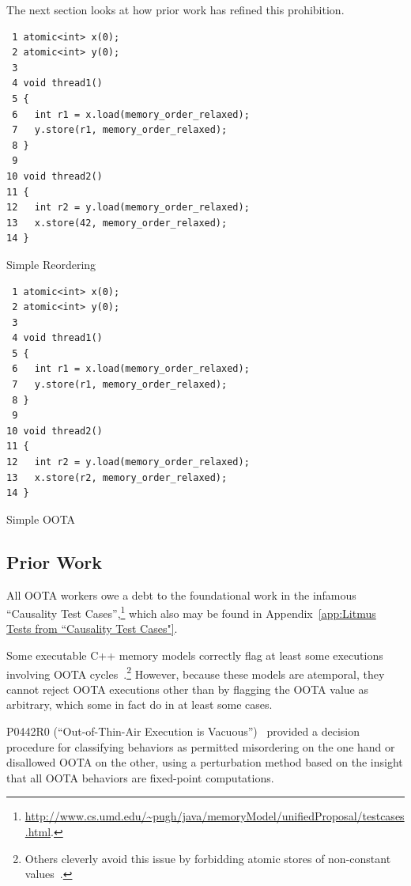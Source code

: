 \documentclass[10]{article}
\begin{document}
The next section looks at how prior work has refined this prohibition.

\begin{listing}[tbp]
\begin{verbatim}
 1 atomic<int> x(0);
 2 atomic<int> y(0);
 3
 4 void thread1()
 5 {
 6   int r1 = x.load(memory_order_relaxed);
 7   y.store(r1, memory_order_relaxed);
 8 }
 9
10 void thread2()
11 {
12   int r2 = y.load(memory_order_relaxed);
13   x.store(42, memory_order_relaxed);
14 }
\end{verbatim}
\caption{Simple Reordering}
\label{lst:Simple Reordering}
\end{listing}

\begin{listing}[tbp]
\begin{verbatim}
 1 atomic<int> x(0);
 2 atomic<int> y(0);
 3
 4 void thread1()
 5 {
 6   int r1 = x.load(memory_order_relaxed);
 7   y.store(r1, memory_order_relaxed);
 8 }
 9
10 void thread2()
11 {
12   int r2 = y.load(memory_order_relaxed);
13   x.store(r2, memory_order_relaxed);
14 }
\end{verbatim}
\caption{Simple OOTA}
\label{lst:Simple OOTA}
\end{listing}

\subsection{Prior Work}
\label{sec:Prior Work}

All OOTA workers owe a debt to the foundational work in the infamous
``Causality Test Cases'',\footnote{
	\url{http://www.cs.umd.edu/~pugh/java/memoryModel/unifiedProposal/testcases.html}.}
which also may be found in
Appendix~\ref{app:Litmus Tests from “Causality Test Cases"}.

Some executable C++ memory models correctly flag at least some executions
involving OOTA cycles~\cite{JadeAlglave2014HerdingCats}.\footnote{
	Others cleverly avoid this issue by forbidding atomic
	stores of non-constant values~\cite{MarkBatty2011cppmem}.}
However, because these models are atemporal, they cannot reject
OOTA executions other than by flagging the OOTA value as arbitrary,
which some in fact do in at least some cases.

P0442R0 (``Out-of-Thin-Air Execution is Vacuous'')~\cite{PaulEMcKenney2016OOTA}
provided a decision procedure for classifying behaviors as permitted
misordering on the one hand or disallowed OOTA on the other, using
a perturbation method based on the insight that all OOTA behaviors are
fixed-point computations.
\end{document}
